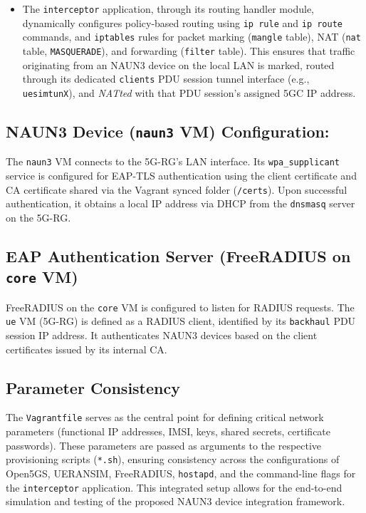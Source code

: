\begin{itemize}
{\begin{itemize}
            \item The \texttt{interceptor} application, through its routing handler module, dynamically configures policy-based routing using \texttt{ip rule} and \texttt{ip route} commands, and \texttt{iptables} rules for packet marking (\texttt{mangle} table), \ac{NAT} (\texttt{nat} table, \texttt{MASQUERADE}), and forwarding (\texttt{filter} table). This ensures that traffic originating from an \ac{NAUN3} device on the local \ac{LAN} is marked, routed through its dedicated \texttt{clients} \ac{PDU} session tunnel interface (e.g., \texttt{uesimtunX}), and \textit{NATted} with that \ac{PDU} session's assigned \ac{5GC} \ac{IP} address.
        \end{itemize}
    }
\end{itemize}

\subsection{\acs{NAUN3} Device (\texttt{naun3} \acs{VM}) Configuration:}

The \texttt{naun3} \ac{VM} connects to the \ac{5G-RG}'s \ac{LAN} interface. Its \texttt{wpa\_supplicant} service is configured for \ac{EAP-TLS} authentication using the client certificate and \ac{CA} certificate shared via the Vagrant synced folder (\texttt{/certs}). Upon successful authentication, it obtains a local \ac{IP} address via \ac{DHCP} from the \texttt{dnsmasq} server on the \ac{5G-RG}.

\subsection{\acs{EAP} Authentication Server (FreeRADIUS on \texttt{core} \acs{VM})}

FreeRADIUS on the \texttt{core} \ac{VM} is configured to listen for \ac{RADIUS} requests. The \texttt{ue} \ac{VM} (\ac{5G-RG}) is defined as a \ac{RADIUS} client, identified by its \texttt{backhaul} \ac{PDU} session \ac{IP} address. It authenticates \ac{NAUN3} devices based on the client certificates issued by its internal \ac{CA}.

\subsection{Parameter Consistency}

The \texttt{Vagrantfile} serves as the central point for defining critical network parameters (functional \ac{IP} addresses, \ac{IMSI}, keys, shared secrets, certificate passwords). These parameters are passed as arguments to the respective provisioning scripts (\texttt{*.sh}), ensuring consistency across the configurations of Open5GS, UERANSIM, FreeRADIUS, \texttt{hostapd}, and the command-line flags for the \texttt{interceptor} application. This integrated setup allows for the end-to-end simulation and testing of the proposed \ac{NAUN3} device integration framework.

